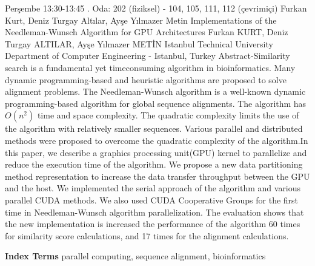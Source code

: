 
    \begin{abstract_basarim}
    {Perşembe 13:30-13:45}
    {.}
    {Oda: 202 (fiziksel) - 104, 105, 111, 112 (çevrimiçi)}
    {Furkan Kurt, Deniz Turgay Altılar, Ayşe Yılmazer Metin}
    {Implementations of the Needleman-Wunsch Algorithm for GPU Architectures}
    {%
    Furkan KURT, Deniz Turgay ALTILAR, Ayşe Yılmazer METİN}
    {%
    }
    {%
    Istanbul Technical University Department of Computer Engineering - Istanbul, Turkey}
    Abstract-Similarity search is a fundamental yet timeconsuming algorithm in bioinformatics. Many dynamic programming-based and heuristic algorithms are proposed to solve alignment problems. The Needleman-Wunsch algorithm is a well-known dynamic programming-based algorithm for global sequence alignments. The algorithm has $O\left(n^{2}\right)$ time and space complexity. The quadratic complexity limits the use of the algorithm with relatively smaller sequences. Various parallel and distributed methods were proposed to overcome the quadratic complexity of the algorithm.\newline In this paper, we describe a graphics processing unit(GPU) kernel to parallelize and reduce the execution time of the algorithm. We propose a new data partitioning method representation to increase the data transfer throughput between the GPU and the host. We implemented the serial approach of the algorithm and various parallel CUDA methods. We also used CUDA Cooperative Groups for the first time in Needleman-Wunsch algorithm parallelization. The evaluation shows that the new implementation is increased the performance of the algorithm 60 times for similarity score calculations, and 17 times for the alignment calculations. 
    
            \textbf{Index Terms} \newline{}parallel computing, sequence alignment, bioinformatics
    \end{abstract_basarim}
    